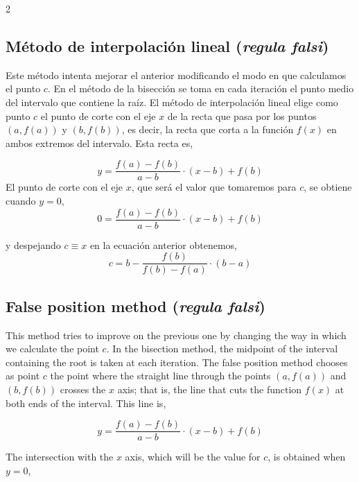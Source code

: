 \begin{paracol}{2}
\subsection{Método de interpolación lineal (\emph{regula falsi})}
Este método intenta mejorar el anterior modificando el modo en que calculamos el punto $c$. En el método de la bisección se toma en cada iteración el punto medio del intervalo que contiene la raíz. El método de interpolación lineal elige como punto $c$ el punto de corte con el eje $x$ de la recta que pasa por los puntos $\left(a,f(a)\right)$ y $\left(b,f(b)\right)$, es decir, la recta que corta a la función $f(x)$ en ambos extremos del intervalo. Esta recta es,

\begin{equation*}
y=\frac{f(a)-f(b)}{a-b}\cdot(x-b)+f(b)
\end{equation*}
El punto de corte con el eje $x$, que será el valor que tomaremos para $c$, se obtiene cuando $y=0$,
\begin{equation*}
0=\frac{f(a)-f(b)}{a-b}\cdot(x-b)+f(b)
\end{equation*}

y despejando $c\equiv x$ en la ecuación anterior obtenemos,
\begin{equation*}
c=b-\frac{f(b)}{f(b)-f(a)}\cdot(b-a)
\end{equation*}

\switchcolumn

\subsection{False position method (\emph{regula falsi})}

This method tries to improve on the previous one by changing the way in which we calculate the point $c$. In the bisection method, the midpoint of the interval containing the root is taken at each iteration. The false position method chooses as point $c$ the point where the straight line through the points $\left(a,f(a)\right)$ and $\left(b,f(b)\right)$ crosses the $x$ axis; that is, the line that cuts the function $f(x)$ at both ends of the interval. This line is,

\begin{equation*}
y=\frac{f(a)-f(b)}{a-b}\cdot(x-b)+f(b)
\end{equation*}

The intersection with the $x$ axis, which will be the value for $c$, is obtained when $y=0$,


\end{paracol}
